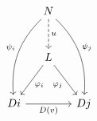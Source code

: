\documentclass[border=6pt]{standalone}
\begin{document}
$
\begin{tikzcd}[column sep=small, row sep=large]
  & N \arrow[d, "u", dashed] \arrow[ddl, bend right=25, "\psi_i"'] \arrow[ddr, bend left=25, "\psi_j"] & \\
  & L \arrow[dl, "\varphi_i"] \arrow[dr, "\varphi_j"'] & \\
  Di \arrow[rr, "D(v)"'] & & Dj
\end{tikzcd}
$
\end{document}
